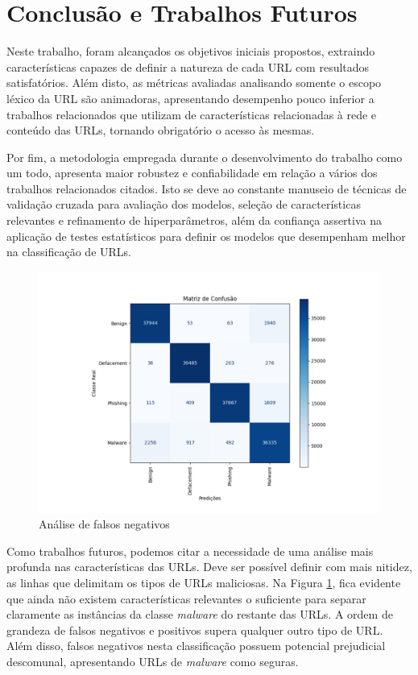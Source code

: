 \documentclass[manuscript,screen,review]{acmart}
\begin{document}
\section{Conclusão e Trabalhos Futuros} \label{sec:5}

Neste trabalho, foram alcançados os objetivos iniciais propostos, extraindo características capazes de definir a natureza de cada URL com resultados satisfatórios. Além disto, as métricas avaliadas analisando somente o escopo léxico da URL são animadoras, apresentando desempenho pouco inferior a trabalhos relacionados que utilizam de características relacionadas à rede e conteúdo das URLs, tornando obrigatório o acesso às mesmas.

Por fim, a metodologia empregada durante o desenvolvimento do trabalho como um todo, apresenta maior robustez e confiabilidade em relação a vários dos trabalhos relacionados citados. Isto se deve ao constante manuseio de técnicas de validação cruzada para avaliação dos modelos, seleção de características relevantes e refinamento de hiperparâmetros, além da confiança assertiva na aplicação de testes estatísticos para definir os modelos que desempenham melhor na classificação de URLs.

\begin{figure}[H]
    \centering
    \includegraphics[width=1.1\textwidth]{pic/confusion.pdf}
    \caption{Análise de falsos negativos}
    \label{fig:exampleFig3}
\end{figure}

Como trabalhos futuros, podemos citar a necessidade de uma análise mais profunda nas características das URLs. Deve ser possível definir com mais nitidez, as linhas que delimitam os tipos de URLs maliciosas. Na Figura \ref{fig:exampleFig3}, fica evidente que ainda não existem características relevantes o suficiente para separar claramente as instâncias da classe \emph{malware} do restante das URLs. A ordem de grandeza de falsos negativos e positivos supera qualquer outro tipo de URL. Além disso, falsos negativos nesta classificação possuem potencial prejudicial descomunal, apresentando URLs de \emph{malware} como seguras.
\end{document}
